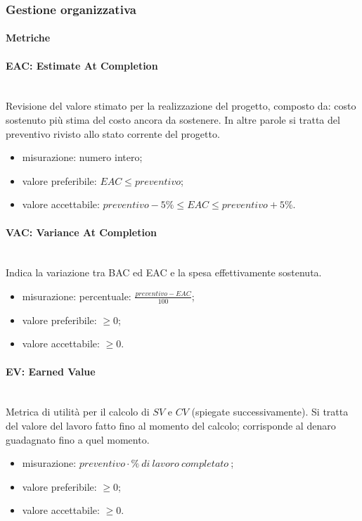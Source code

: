 	\subsubsection{Gestione organizzativa}
\paragraph{Metriche}			
\paragraph*{EAC: Estimate At Completion}\mbox{}\\
Revisione del valore stimato per la realizzazione del progetto, composto da: costo sostenuto più stima del costo ancora da sostenere. In altre parole si tratta del preventivo rivisto allo stato corrente del progetto.
\begin{itemize}
	\item  misurazione: numero intero;
	\item  valore preferibile: $ EAC \leq preventivo$;
	\item  valore accettabile: $ preventivo -5\% \leq EAC \leq preventivo + 5\%$. 
\end{itemize}

\paragraph*{VAC: Variance At Completion}\mbox{}\\
Indica la variazione tra BAC ed EAC e la spesa effettivamente sostenuta.
\begin{itemize}
	\item  misurazione: percentuale: $\frac{preventivo - EAC}{100}$;
	\item  valore preferibile: $\geq 0$;
	\item  valore accettabile: $\geq 0$.
\end{itemize}

\paragraph*{EV: Earned Value}\mbox{}\\
Metrica di utilità per il calcolo di $SV$ e $CV$ (spiegate successivamente). Si tratta del valore del lavoro fatto fino al momento del calcolo; corrisponde al denaro guadagnato fino a quel momento.
\begin{itemize}
	\item  misurazione: $preventivo \cdot \%\ di\ lavoro\ completato\ $;
	\item  valore preferibile: $ \geq 0$;
	\item  valore accettabile: $ \geq 0$.
\end{itemize}

